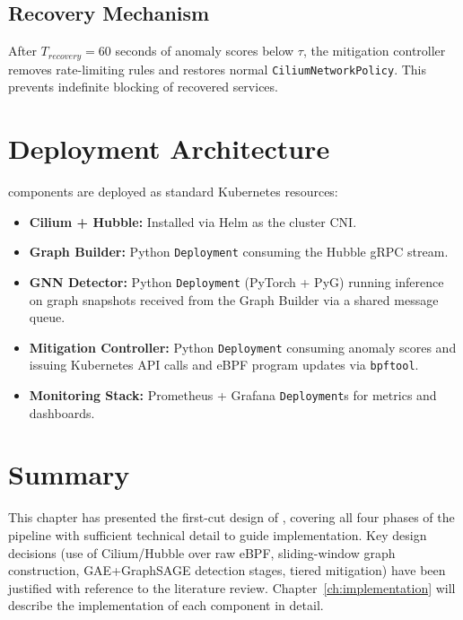 \subsection{Recovery Mechanism}

After $T_{recovery} = 60$ seconds of anomaly scores below $\tau$, the mitigation
controller removes rate-limiting rules and restores normal \texttt{CiliumNetworkPolicy}.
This prevents indefinite blocking of recovered services.

\section{Deployment Architecture}
\label{sec:design_deployment}

\sys{} components are deployed as standard Kubernetes resources:

\begin{itemize}
  \item \textbf{Cilium + Hubble:} Installed via Helm as the cluster CNI.
  \item \textbf{Graph Builder:} Python \texttt{Deployment} consuming the Hubble gRPC stream.
  \item \textbf{GNN Detector:} Python \texttt{Deployment} (PyTorch + PyG) running inference
  on graph snapshots received from the Graph Builder via a shared message queue.
  \item \textbf{Mitigation Controller:} Python \texttt{Deployment} consuming anomaly scores
  and issuing Kubernetes API calls and eBPF program updates via \texttt{bpftool}.
  \item \textbf{Monitoring Stack:} Prometheus + Grafana \texttt{Deployment}s for metrics
  and dashboards.
\end{itemize}

\section{Summary}
This chapter has presented the first-cut design of \sys{}, covering all four phases of the
pipeline with sufficient technical detail to guide implementation. Key design decisions
(use of Cilium/Hubble over raw eBPF, sliding-window graph construction, GAE+GraphSAGE
detection stages, tiered mitigation) have been justified with reference to the literature
review. Chapter~\ref{ch:implementation} will describe the implementation of each
component in detail.
